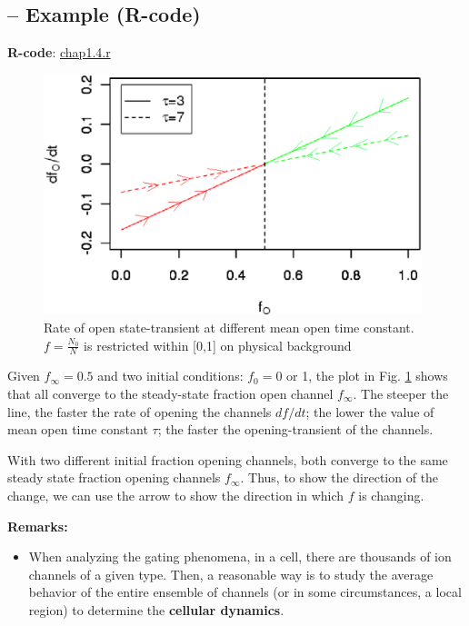 
\subsection{-- Example (R-code)}

{\bf R-code}: \hyperref[chap1.4.r]{chap1.4.r}

\begin{figure}[htb]
  \centerline{\includegraphics[height=7cm]{./images/gating_rate.eps}}
  \caption{Rate of open state-transient at different mean open time
    constant. $f =\frac{N_0}{N}$ is restricted within [0,1] on
    physical background}\label{fig:gating-rate}
\end{figure}

Given $f_\infty = 0.5$ and two initial conditions: $f_0 = 0$ or 1, the
plot in Fig. \ref{fig:gating-rate} shows that all converge to the
steady-state fraction open channel $f_\infty$.  The steeper the line,
the faster the rate of opening the channels $df/dt$; the lower the
value of mean open time constant $\tau$; the faster the
opening-transient of the channels.  

With two different initial fraction opening channels, both converge to
the same steady state fraction opening channels $f_\infty$. Thus, to
show the direction of the change, we can use the arrow to show the
direction in which $f$ is changing. 

{\bf Remarks:} 
\begin{itemize}
\item When analyzing the gating phenomena, in a cell, there are
  thousands of ion channels of a given type. Then, a reasonable way is
  to study the average behavior of the entire ensemble of channels (or
  in some circumstances, a local region) to determine the {\bf
    cellular dynamics}.
\end{itemize}

